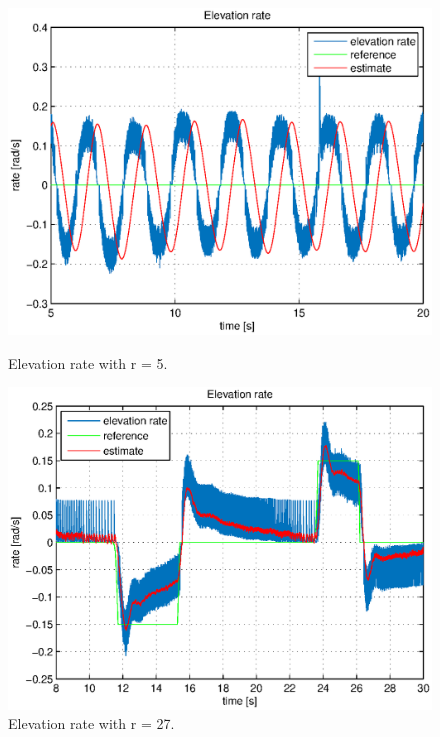 \begin{figure}[H]
	\hspace{-2.7cm}
	\begin{minipage}{.5\textwidth}
	    \centering
		\includegraphics[width=0.9\linewidth]{plots/part4new/P/e_rate_5.eps}
	    \caption{Elevation rate with r = 5.}
        \label{fig:e_rate_5}
    \end{minipage}%
    \begin{minipage}{.5\textwidth}
        \centering
		\includegraphics[width=0.9\linewidth]{plots/part4new/P/e_rate_27.eps}
	    \caption{Elevation rate with r = 27.}
        \label{fig:e_rate_27}
    \end{minipage}%
    \begin{minipage}{.5\textwidth}
    \centering

\end{minipage}
\end{figure}
